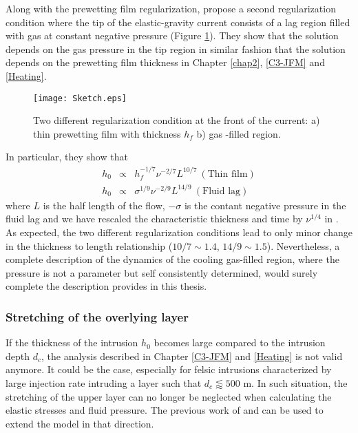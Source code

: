 Along      with      the     prewetting      film      regularization,
\citet{Anonymous:QWXp_4JV} propose  a second  regularization condition
where the tip of the elastic-gravity  current consists of a lag region
filled   with    gas   at    constant   negative    pressure   (Figure
\ref{C7-Sketch}).   They show  that the  solution depends  on the  gas
pressure  in the  tip  region  in similar  fashion  that the  solution
depends  on  the prewetting  film  thickness  in Chapter  \ref{chap2},
\ref{C3-JFM} and \ref{Heating}.
\begin{figure}[h!]
  \begin{center}
    \graphicspath{ {/Users/thorey/Documents/These/Manuscript/Figure/Chapter7/} }
    \texttt{[image: Sketch.eps]}
    \caption{Two different  regularization condition  at the  front of
      the current: a) thin prewetting film with thickness $h_f$ b) gas
      -filled region.}
    \label{C7-Sketch}
  \end{center}
\end{figure}
In particular, they show that
\begin{eqnarray}
  h_0&\propto& h_f^{-1/7}\nu^{-2/7}L^{10/7}~(\text{Thin film})\\
  h_0&\propto& \sigma^{1/9}\nu^{-2/9}L^{14/9}~(\text{Fluid lag})
\end{eqnarray}
where $L$  is the half  length of the  flow, $-\sigma$ is  the contant
negative  pressure  in  the  fluid   lag  and  we  have  rescaled  the
characteristic    thickness    and     time    by    $\nu^{1/4}$    in
\citet{Anonymous:QWXp_4JV}.    As   expected,    the   two   different
regularization conditions lead  to only minor change  in the thickness
to   length   relationship   ($10/7\sim  1.4$,   $14/9\sim   1.5   $).
Nevertheless, a  complete description of  the dynamics of  the cooling
gas-filled  region, where  the pressure  is not  a parameter  but self
consistently  determined,   would  surely  complete   the  description
provides in this thesis.

\subsubsection*{Stretching of the overlying layer}

If the thickness of the intrusion  $h_0$ becomes large compared to the
intrusion depth $d_c$, the  analysis described in Chapter \ref{C3-JFM}
and  \ref{Heating}  is  not  valid  anymore. It  could  be  the  case,
especially for felsic intrusions characterized by large injection rate
intruding a layer such that $d_c\lessapprox 500$ m. In such situation,
the stretching  of the  upper layer  can no  longer be  neglected when
calculating the elastic stresses and fluid pressure. The previous work
of \citet{Lister:2013ia} and \citet{Anonymous:QWXp_4JV} can be used to
extend the model in that direction.

